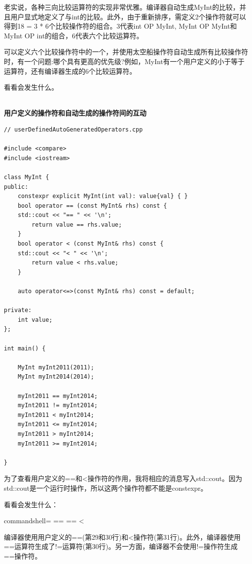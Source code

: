 老实说，各种三向比较运算符的实现非常优雅。编译器自动生成MyInt的比较，并且用户显式地定义了与int的比较。此外，由于重新排序，需定义2个操作符就可以得到18 = 3 * 6个比较操作符的组合。3代表int OP MyInt, MyInt OP MyInt和MyInt OP int的组合，6代表六个比较运算符。


可以定义六个比较操作符中的一个，并使用太空船操作符自动生成所有比较操作符时，有一个问题:哪个具有更高的优先级?例如，MyInt有一个用户定义的小于等于运算符，还有编译器生成的6个比较运算符。

看看会发生什么。

\hspace*{\fill} \\ %
\noindent
\textbf{用户定义的操作符和自动生成的操作符间的互动}
\begin{lstlisting}[style=styleCXX]
// userDefinedAutoGeneratedOperators.cpp

#include <compare>
#include <iostream>

class MyInt {
public:
	constexpr explicit MyInt(int val): value{val} { }
	bool operator == (const MyInt& rhs) const {
	std::cout << "== " << '\n';
		return value == rhs.value;
	}
	bool operator < (const MyInt& rhs) const {
	std::cout << "< " << '\n';
		return value < rhs.value;
	}
	
	auto operator<=>(const MyInt& rhs) const = default;

private:
	int value;
};

int main() {

	MyInt myInt2011(2011);
	MyInt myInt2014(2014);
	
	myInt2011 == myInt2014;
	myInt2011 != myInt2014;
	myInt2011 < myInt2014;
	myInt2011 <= myInt2014;
	myInt2011 > myInt2014;
	myInt2011 >= myInt2014;

}
\end{lstlisting}

为了查看用户定义的==和<操作符的作用，我将相应的消息写入std::cout。因为std::cout是一个运行时操作，所以这两个操作符都不能是constexpr。

看看会发生什么：

\begin{tcblisting}{commandshell={}}
==
==
<
\end{tcblisting}

编译器使用用户定义的==(第29和30行)和<操作符(第31行)。此外，编译器使用==运算符生成了!=运算符(第30行)。另一方面，编译器不会使用!=操作符生成==操作符。

